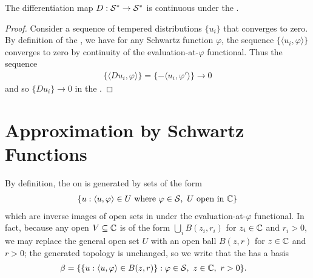   \begin{claim}
    The differentiation map $D:\mathcal{S}^*\rightarrow\mathcal{S}^*$ is continuous under the \ws.
  \end{claim}
  \begin{proof}
    Consider a sequence of tempered distributions $\{u_i\}$ that converges to zero.
    By definition of the \ws, we have for any Schwartz function $\varphi$, the sequence $\{\langle u_i,\varphi\rangle\}$ converges to zero by continuity of the evaluation-at-$\varphi$ functional.
    Thus the sequence 
    \begin{align*}
      \{\langle Du_i, \varphi\rangle\} = \{-\langle u_i, \varphi'\rangle\} \rightarrow 0
    \end{align*}
    and so $\{Du_i\}\rightarrow 0$ in the \ws.
  \end{proof}

  \section{Approximation by Schwartz Functions}
    By definition, the \ws on \SS is generated by sets of the form 
    \begin{align*}
      \{u:\langle u,\varphi\rangle \in U\text{ where }\varphi\in\mathcal{S},~U\text{ open in }\mathbb{C}\}
    \end{align*}
    which are inverse images of open sets in \C under the evaluation-at-$\varphi$ functional.
    In fact, because any open $V\subseteq\mathbb{C}$ is of the form $\bigcup_i B(z_i,r_i)$ for $z_i\in\mathbb{C}$ and $r_i>0$, we may replace the general open set $U$ with an open ball $B(z,r)$ for $z\in\mathbb{C}$ and $r>0$; the generated topology is unchanged, so we write that the \ws has a basis
    \begin{align*}
      \beta &=
      \{\{u:\langle u,\varphi\rangle \in B(z,r)\}:\varphi\in\mathcal{S},~z\in\mathbb{C},~r>0 \}\text{.}
    \end{align*}

